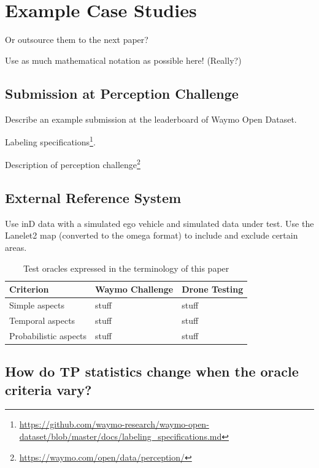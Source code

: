 \documentclass[conference]{IEEEtran}
\begin{document}
\section{Example Case Studies}

Or outsource them to the next paper?

Use as much mathematical notation as possible here! (Really?)

\subsection{Submission at Perception Challenge}
\label{sec:perception_challenge}

Describe an example submission at the leaderboard of Waymo Open Dataset. 

Labeling specifications\footnote{\url{https://github.com/waymo-research/waymo-open-dataset/blob/master/docs/labeling_specifications.md}}.

Description of perception challenge\footnote{\url{https://waymo.com/open/data/perception/}}


\subsection{External Reference System}

Use inD data with a simulated ego vehicle and simulated data under test.
Use the Lanelet2 map (converted to the omega format) to include and exclude certain areas.

\begin{table}[t]
	\centering
	\caption{Test oracles expressed in the terminology of this paper}
	\label{table:case_study}
	\begin{tabularx}{\linewidth}{
			>{\hsize=0.40\hsize}X 
			>{\hsize=0.8\hsize}X 
			>{\hsize=0.8\hsize}X 
		} 
		\toprule
		\textbf{Criterion} & \textbf{Waymo Challenge} & \textbf{Drone Testing} \\
		\midrule
		Simple aspects %
		& stuff
		& stuff \\
		\hline
		Temporal aspects 
		& stuff
		& stuff  \\ 
		\hline
		Probabilistic aspects 
		& stuff
		& stuff  \\ 
		\bottomrule
	\end{tabularx}
\end{table}


\subsection{How do TP statistics change when the oracle criteria vary?}
\end{document}
